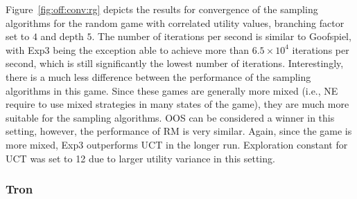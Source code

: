 Figure~\ref{fig:off:conv:rg} depicts the results for convergence of the sampling algorithms for the random game with correlated utility values, branching factor set to $4$ and depth $5$. 
The number of iterations per second is similar to Goofspiel, with Exp3 being the exception able to achieve more than $6.5\times10^4$ iterations per second, which is still significantly the lowest number of iterations.
Interestingly, there is a much less difference between the performance of the sampling algorithms in this game. 
Since these games are generally more mixed (i.e., NE require to use mixed strategies in many states of the game), they are much more suitable for the sampling algorithms. 
OOS can be considered a winner in this setting, however, the performance of RM is very similar. 
Again, since the game is more mixed, Exp3 outperforms UCT in the longer run. 
Exploration constant for UCT was set to 12 due to larger utility variance in this setting.

\subsubsection{Tron}

